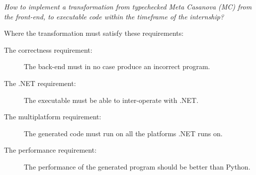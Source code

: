 \textit{How to implement a transformation from typechecked Meta Casanova (MC) from the front-end, to executable code within the timeframe of the internship?}

Where the transformation must satisfy these requirements:
\begin{description}
    \item[The correctness requirement:] The back-end must in no case produce an incorrect program.
    \item[The .NET requirement:] The executable must be able to inter-operate with .NET.
    \item[The multiplatform requirement:] The generated code must run on all the platforms .NET runs on.
    \item[The performance requirement:] The performance of the generated program should be better than Python.
\end{description}
